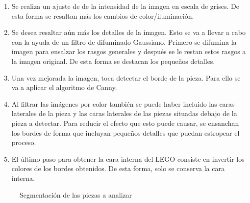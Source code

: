 \begin{enumerate}
\item Se realiza un ajuste de de la intensidad de la imagen en escala de grises. De esta forma se resaltan más los cambios de color/iluminación.

\item Se desea resaltar aún más los detalles de la imagen. Esto se va a llevar a cabo con la ayuda de un filtro de difuminado Gaussiano. Primero se difumina la imagen para ensalzar los rasgos generales y después se le restan estos rasgos a la imagen original. De esta forma se destacan los pequeños detalles.

\item Una vez mejorada la imagen, toca detectar el borde de la pieza. Para ello se va a aplicar el algoritmo de Canny.

\item Al filtrar las imágenes por color también se puede haber incluido las caras laterales de la pieza y las caras laterales de las piezas situadas debajo de la pieza a detectar. Para reducir el efecto que esto puede causar, se ensanchan los bordes de forma que incluyan pequeños detalles que puedan estropear el proceso.

\item El último paso para obtener la cara interna del LEGO consiste en invertir los colores de los bordes obtenidos. De esta forma, solo se conserva la cara interna.
\end{enumerate}


\begin{figure}[p]  %
  \hfill	
  \hfill	
\caption{Segmentación de las piezas a analizar}
\label{fig:mejora1}
\vspace{-5pt}
\end{figure}

